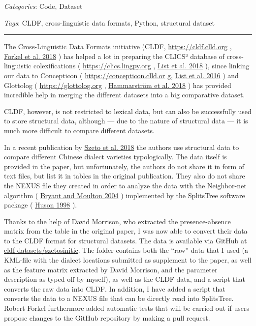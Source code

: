 \documentclass[
  english,
  a4paper,
  oneside,tablecaptionabove
]{scrbook}
\begin{document}
\emph{Categories}: Code, Dataset

\emph{Tags}: CLDF, cross-linguistic data formats, Python, structural
dataset

\begin{center}\rule{0.5\linewidth}{\linethickness}\end{center}

The Cross-Linguistic Data Formats initiative (CLDF,
\url{https://cldf.clld.org} ,
\href{http://bibliography.lingpy.org?key=Forkel2018}{Forkel et al. 2018}
) has helped a lot in preparing the CLICS² database of cross-linguistic
colexifications ( \url{https://clics.lingpy.org} ,
\href{http://bibliography.lingpy.org?key=List2018e}{List et al. 2018} ),
since linking our data to Concepticon (
\url{https://concepticon.clld.or} g,
\href{http://bibliography.lingpy.org?key=List2016xxx}{List et al. 2016}
) and Glottolog ( \url{https://glottolog.org} ,
\href{http://bibliography.lingpy.org?key=Hammarstroem2018}{Hammarström
et al. 2018} ) has provided incredible help in merging the different
datasets into a big comparative dataset.

CLDF, however, is not restricted to lexical data, but can also be
successfully used to store structural data, although --- due to the
nature of structural data --- it is much more difficult to compare
different datasets.

\leavevmode\hypertarget{markdown}{}%
In a recent publication by
\href{http://bibliography.lingpy.org?key=Szeto2018}{Szeto et al. 2018}
the authors use structural data to compare different Chinese dialect
varieties typologically. The data itself is provided in the paper, but
unfortunately, the authors do not share it in form of text files, but
list it in tables in the original publication. They also do not share
the NEXUS file they created in order to analyze the data with the
Neighbor-net algorithm (
\href{http://bibliography.lingpy.org?key=Bryant2004}{Bryant and Moulton
2004} ) implemented by the SplitsTree software package (
\href{http://bibliography.lingpy.org?key=Huson1998}{Huson 1998} ).

Thanks to the help of David Morrison, who extracted the presence-absence
matrix from the table in the original paper, I was now able to convert
their data to the CLDF format for structural datasets. The data is
available via GitHub at
\href{https://github.com/cldf-datasets/szetosinitic}{cldf-datasets/szetosinitic}.
The folder contains both the \enquote{raw} data that I used (a KML-file
with the dialect locations submitted as supplement to the paper, as well
as the feature matrix extracted by David Morrison, and the parameter
description as typed off by myself), as well as the CLDF data, and a
script that converts the raw data into CLDF. In addition, I have added a
script that converts the data to a NEXUS file that can be directly read
into SplitsTree. Robert Forkel furthermore added automatic tests that
will be carried out if users propose changes to the GitHub repository by
making a pull request.
\end{document}
